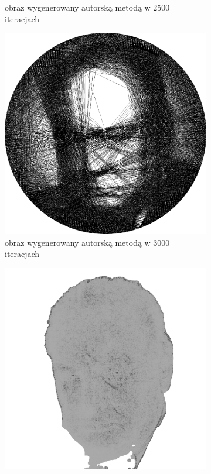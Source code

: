 \begin{figure}[H]
\begin{subfigure}{0.30\textwidth}
        \caption{obraz wygenerowany autorską metodą w 2500 iteracjach}
        \label{comp-comp-churchill-d}
    \end{subfigure}
    \begin{subfigure}{0.30\textwidth}
        \centering
        \includegraphics[width = \textwidth]{img/6-comp/churchill_e_i3000_c20_inv0_bg1_obj1_ed1.png}
        \caption{obraz wygenerowany autorską metodą w 3000 iteracjach}
        \label{comp-comp-churchill-e}
    \end{subfigure}
    \begin{subfigure}{0.30\textwidth}
        \centering
        \includegraphics[width = \textwidth]{img/6-comp/churchill_mask_c20_inv0_bg1_obj2_ed1.png}

\end{subfigure}
\end{figure}
